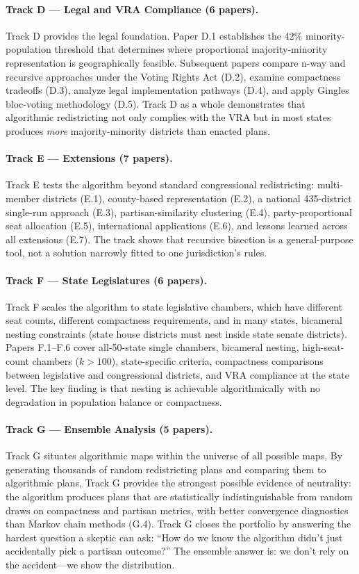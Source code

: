 \paragraph{Track D --- Legal and VRA Compliance (6 papers).}
Track D provides the legal foundation.
Paper D.1 establishes the 42\% minority-population threshold that determines
where proportional majority-minority representation is geographically feasible.
Subsequent papers compare n-way and recursive approaches under the Voting Rights
Act (D.2), examine compactness tradeoffs (D.3), analyze legal implementation
pathways (D.4), and apply Gingles bloc-voting methodology (D.5).
Track D as a whole demonstrates that algorithmic redistricting not only complies
with the VRA but in most states produces \emph{more} majority-minority districts
than enacted plans.

\paragraph{Track E --- Extensions (7 papers).}
Track E tests the algorithm beyond standard congressional redistricting:
multi-member districts (E.1), county-based representation (E.2), a
national 435-district single-run approach (E.3), partisan-similarity
clustering (E.4), party-proportional seat allocation (E.5), international
applications (E.6), and lessons learned across all extensions (E.7).
The track shows that recursive bisection is a general-purpose tool,
not a solution narrowly fitted to one jurisdiction's rules.

\paragraph{Track F --- State Legislatures (6 papers).}
Track F scales the algorithm to state legislative chambers,
which have different seat counts, different compactness requirements,
and in many states, bicameral nesting constraints (state house districts
must nest inside state senate districts).
Papers F.1--F.6 cover all-50-state single chambers, bicameral nesting,
high-seat-count chambers ($k > 100$), state-specific criteria, compactness
comparisons between legislative and congressional districts, and
VRA compliance at the state level.
The key finding is that nesting is achievable algorithmically with no
degradation in population balance or compactness.

\paragraph{Track G --- Ensemble Analysis (5 papers).}
Track G situates algorithmic maps within the universe of all possible maps.
By generating thousands of random redistricting plans and comparing them
to algorithmic plans, Track G provides the strongest possible evidence of
neutrality: the algorithm produces plans that are statistically
indistinguishable from random draws on compactness and partisan metrics,
with better convergence diagnostics than Markov chain methods (G.4).
Track G closes the portfolio by answering the hardest question a skeptic
can ask: ``How do we know the algorithm didn't just accidentally pick
a partisan outcome?''  The ensemble answer is: we don't rely on
the accident---we show the distribution.
